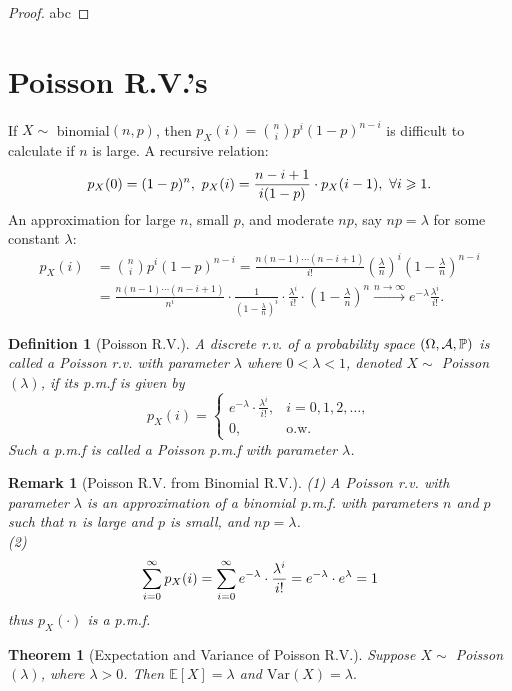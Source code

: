 \documentclass[openany,12pt]{book}
\newtheorem{theorem}{Theorem}[chapter]
\newtheorem{remark}{Remark}[chapter]
\newtheorem{definition}{Definition}[chapter]
\begin{document}
\begin{proof}
  abc
\end{proof}

\section{Poisson R.V.'s}

If $X\sim$ binomial$(n,p)$, then $p_X(i)=\binom n i p^i (1-p)^{n-i}$ is difficult to calculate if $n$ is large. A recursive relation:
$$
  p_X(0)=(1-p)^n,~p_X(i)=\frac{n-i+1}{i(1-p)} \cdot p_X(i-1),~\forall i\geqslant1.
$$
An approximation for large $n$, small $p$, and moderate $np$, say $np=\lambda$ for some constant $\lambda$:
$$
  \begin{aligned}
    p_X(i) & =\binom n i p^i (1-p)^{n-i}=\frac{n(n-1)\cdots(n-i+1)}{i!}\left(\frac{\lambda}{n}\right)^i \left(1-\frac{\lambda}{n} \right)^{n-i}                                                                             \\
            & =\frac{n(n-1)\cdots(n-i+1)}{n^i}\cdot\frac{1}{\left(1-\frac{\lambda}{n}\right)^i }\cdot\frac{\lambda^i}{i!}\cdot\left(1-\frac{\lambda}{n}\right)^n  \xrightarrow{n\to\infty}e^{-\lambda} \frac{\lambda^i}{i!}.
  \end{aligned}
$$

\begin{definition}[Poisson R.V.]
  A discrete r.v. of a probability space $(\Omega,\mathcal{A},\mathbb{P})$ is called a Poisson r.v. with parameter $\lambda$ where $0<\lambda<1$, denoted $X\sim$ Poisson$(\lambda)$, if its p.m.f is given by
  $$
    p_X(i)=
    \begin{cases}
      e^{-\lambda}\cdot \frac{\lambda^i}{i!},  & i=0,1,2,\dots, \\
      0, &\text{o.w.}
    \end{cases}
  $$
  Such a p.m.f is called a Poisson p.m.f with parameter $\lambda$.
\end{definition}

\begin{remark}[Poisson R.V. from Binomial R.V.]
  (1) A Poisson r.v. with parameter $\lambda$ is an approximation of a binomial p.m.f. with parameters $n$ and $p$ such that $n$ is large and $p$ is small, and $np=\lambda$.\\
  (2)
  $$
    \sum_{i=0}^{\infty} p_X(i)=\sum_{i=0}^{\infty} e^{-\lambda} \cdot\frac{\lambda^i}{i!}=e^{-\lambda}\cdot e^{\lambda}=1
  $$
  thus $p_X(\cdot)$ is a p.m.f.
\end{remark}

\begin{theorem}[Expectation and Variance of Poisson R.V.]
  Suppose $X\sim$ Poisson$(\lambda)$, where $\lambda>0$. Then $\mathbb{E}[X]=\lambda$ and $\mathrm{Var}(X)=\lambda.$
\end{theorem}
\end{document}
